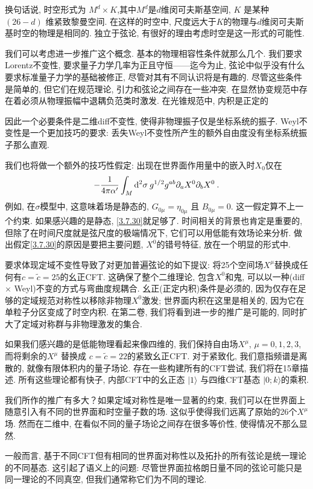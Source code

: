 换句话说, 时空形式为 $M^{d} \times K$,其中$M^{d}$是$d$维闵可夫斯基空间,  $K$ 是某种 $(26-d)$ 维紧致黎曼空间. 在这样的时空中, 尺度远大于$K$的物理与$d$维闵可夫斯基时空的物理是相同的. 独立于弦论, 有很好的理由考虑时空是这一形式的可能性.

我们可以考虑进一步推广这个概念. 基本的物理相容性条件就那么几个. 我们要求Lorentz不变性, 要求量子力学几率为正且守恒——迄今为止, 弦论中似乎没有什么要求标准量子力学的基础被修正, 尽管对其有不同认识将是有趣的. 尽管这些条件是简单的, 但它们在规范理论, 引力和弦论之间存在一些冲突. 在显然协变规范中存在着必须从物理振幅中退耦负范类时激发. 在光锥规范中, 内积是正定的

因此一个必要条件是二维diff不变性, 使得非物理振子仅是坐标系统的振子. Weyl不变性是一个更加技巧的要求: 丢失Weyl不变性所产生的额外自由度没有坐标系统振子那么直观.

我们也将做一个额外的技巧性假定:  出现在世界面作用量中的嵌入时$X_0$仅在
\begin{equation}\label{3.7.30}
-\frac{1}{4 \pi \alpha^{\prime}} \int_{M} \mathrm{d}^{2} \sigma \: g^{1 / 2} g^{a b} \partial_{a} X^{0} \partial_{b} X^{0} \:.
\end{equation}
例如, 在$\sigma$模型中, 这意味着场是静态的,  $G_{0 \mu}=\eta_{0 \mu}$ 且 $B_{0 \mu}=0 $. 这一假定算不上一个约束. 如果感兴趣的是静态,  \eqref{3.7.30}就足够了. 
时间相关的背景也肯定是重要的, 但除了在时间尺度就是弦尺度的极端情况下, 它们可以用低能有效场论来分析. 做出假定\eqref{3.7.30}的原因是要把主要问题, $X^0$的错号特征, 放在一个明显的形式中. 

要求体现定域不变性导致了对更加普遍弦论的如下提议: 将25个空间场$X^{\mu}$替换成任何有$c=\tilde{c}=25$的幺正CFT. 这确保了整个二维理论, 包含$X^{0}$和鬼, 可以以一种(diff $\times$ Weyl)不变的方式与弯曲度规耦合. 幺正(正定内积)条件是必须的, 因为仅存在足够的定域规范对称性以移除非物理$X^{0}$激发; 世界面内积在这里是相关的, 因为它在单粒子分区变成了时空内积. 在第二卷, 我们将看到进一步的推广是可能的, 同时扩大了定域对称群与非物理激发的集合.                                            

如果我们感兴趣的是低能物理看起来像四维的, 我们保持自由场$X^{\mu}$,  $\mu=0,1,2,3$, 而将剩余的$X^{\mu}$ 替换成 $c=\tilde{c}=22$的紧致幺正CFT. 
对于紧致化, 我们意指频谱是离散的, 就像有限体积内的量子场论. 存在一些构建所有的CFT尝试, 我们将在15章描述. 
所有这些理论都有快子, 内部CFT中的幺正态 $|1\rangle$ 与四维CFT基态 $|0 ; k\rangle$的乘积.

我们所作的推广有多大？如果定域对称性是唯一显著的约束, 我们可以在世界面上随意引入有不同的世界面和时空量子数的场. 这似乎使得我们远离了原始的26个$X^\mu$场. 然而在二维中, 在看似不同的量子场论之间存在很多等价性, 使得情况不那么显然.

一般而言, 基于不同CFT但有相同的世界面对称性以及拓扑的所有弦论是统一理论的不同基态. 这引起了语义上的问题: 尽管世界面拉格朗日量不同的弦论可能只是同一理论的不同真空,  但我们通常称它们为不同的理论.
